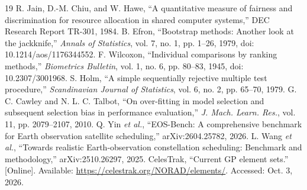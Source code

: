 \documentclass[conference]{IEEEtran}
\begin{document}
\begin{thebibliography}{19}
 R. Jain, D.-M. Chiu, and W. Hawe, ``A quantitative measure of fairness and discrimination for resource allocation in shared computer systems,'' DEC Research Report TR-301, 1984.
 B. Efron, ``Bootstrap methods: Another look at the jackknife,'' \emph{Annals of Statistics}, vol. 7, no. 1, pp. 1--26, 1979, doi: 10.1214/aos/1176344552.
 F. Wilcoxon, ``Individual comparisons by ranking methods,'' \emph{Biometrics Bulletin}, vol. 1, no. 6, pp. 80--83, 1945, doi: 10.2307/3001968.
 S. Holm, ``A simple sequentially rejective multiple test procedure,'' \emph{Scandinavian Journal of Statistics}, vol. 6, no. 2, pp. 65--70, 1979.
 G. C. Cawley and N. L. C. Talbot, ``On over-fitting in model selection and subsequent selection bias in performance evaluation,'' \emph{J. Mach. Learn. Res.}, vol. 11, pp. 2079--2107, 2010.
 Q. Yin \emph{et al.}, ``EOS-Bench: A comprehensive benchmark for Earth observation satellite scheduling,'' arXiv:2604.25782, 2026.
 L. Wang \emph{et al.}, ``Towards realistic Earth-observation constellation scheduling: Benchmark and methodology,'' arXiv:2510.26297, 2025.
 CelesTrak, ``Current GP element sets.'' [Online]. Available: \url{https://celestrak.org/NORAD/elements/}. Accessed: Oct. 3, 2026.
\end{thebibliography}
\end{document}
